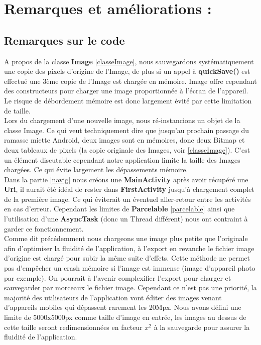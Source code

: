 \section{Remarques et améliorations  :}

\subsection{Remarques sur le code} \label{remarques_code}
A propos de la classe \textbf{Image} \ref{classeImage}, nous sauvegardons systématiquement une copie des pixels d'origine de l'Image, de plus si un appel à \textbf{quickSave()} est effectué une 3ème copie de l'Image est chargée en mémoire. Image offre cependant des constructeurs pour charger une image proportionnée à l'écran de l'appareil. Le risque de débordement mémoire est donc largement évité par cette limitation de taille.
\\

Lors du chargement d'une nouvelle image, nous ré-instancions un objet de la classe Image. Ce qui veut techniquement dire que jusqu'au prochain passage du ramasse miette Android, deux images sont en mémoires, donc deux Bitmap et deux tableaux de pixels (la copie originale des Images, voir \ref{classeImage}). C'est un élément discutable cependant notre application limite la taille des Images chargées. Ce qui évite largement les dépassements mémoire.
\\

Dans la partie \ref{navig} nous créons une \textbf{MainActivity} après avoir récupéré une \textbf{Uri}, il aurait été idéal de rester dans \textbf{FirstActivity} jusqu'à chargement complet de la première image. Ce qui éviterait un éventuel aller-retour entre les activités en cas d'erreur. Cependant les limites de \textbf{Parcelable} \ref{parcelable} ainsi que l'utilisation d'une \textbf{AsyncTask} (donc un Thread différent) nous ont contraint à garder ce fonctionnement.
\\

Comme dit précédemment nous chargeons une image plus petite que l'originale afin d'optimiser la fluidité de l'application, à l'export en revanche le fichier image d'origine est chargé pour subir la même suite d'effets. Cette méthode ne permet pas d'empêcher un crash mémoire si l'image est immense (image d'appareil photo par exemple). On pourrait à l'avenir complexifier l'export pour charger et sauvegarder par morceaux le fichier image. Cependant ce n'est pas une priorité, la majorité des utilisateurs de l'application vont éditer des images venant d'appareils mobiles qui dépassent rarement les 20Mpx.
Nous avons défini une limite de 5000x5000px comme taille d'image en entrée, les images au dessus de cette taille seront redimensionnées en facteur $x^2$ à la sauvegarde pour assurer la fluidité de l'application.
\\


